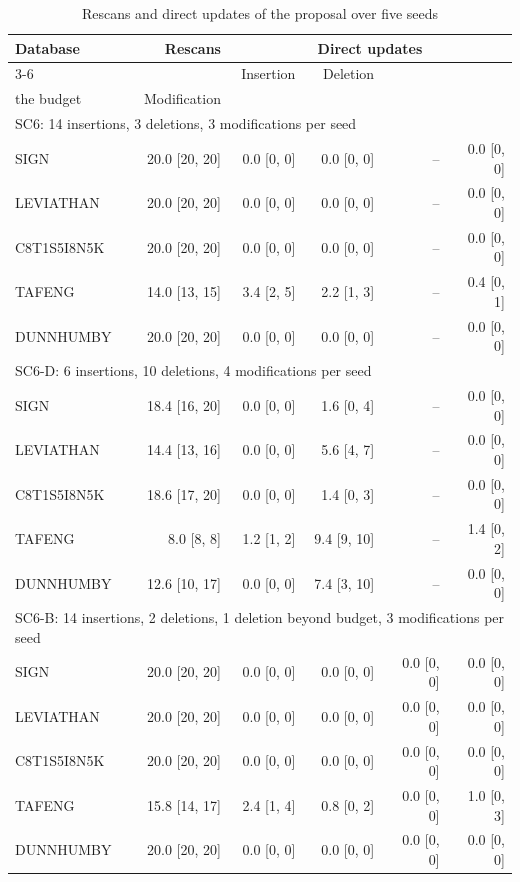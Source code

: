 \begin{table}[!htbp]\centering
\caption{Rescans and direct updates of the proposal over five seeds}\label{tab:sc6_branches}
\begin{tabular*}{\textwidth}{@{\extracolsep\fill}lrrrrr}\toprule
Database & Rescans & \multicolumn{4}{c}{Direct updates} \\\cmidrule{3-6}
 & & Insertion & Deletion & \begin{tabular}[b]{@{}r@{}}Deletion beyond\\the budget\end{tabular} & Modification \\
\midrule\multicolumn{6}{l}{SC6: 14 insertions, 3 deletions, 3 modifications per seed} \\
SIGN & 20.0 [20, 20] & 0.0 [0, 0] & 0.0 [0, 0] & -- & 0.0 [0, 0] \\
LEVIATHAN & 20.0 [20, 20] & 0.0 [0, 0] & 0.0 [0, 0] & -- & 0.0 [0, 0] \\
C8T1S5I8N5K & 20.0 [20, 20] & 0.0 [0, 0] & 0.0 [0, 0] & -- & 0.0 [0, 0] \\
TAFENG & 14.0 [13, 15] & 3.4 [2, 5] & 2.2 [1, 3] & -- & 0.4 [0, 1] \\
DUNNHUMBY & 20.0 [20, 20] & 0.0 [0, 0] & 0.0 [0, 0] & -- & 0.0 [0, 0] \\
\midrule\multicolumn{6}{l}{SC6-D: 6 insertions, 10 deletions, 4 modifications per seed} \\
SIGN & 18.4 [16, 20] & 0.0 [0, 0] & 1.6 [0, 4] & -- & 0.0 [0, 0] \\
LEVIATHAN & 14.4 [13, 16] & 0.0 [0, 0] & 5.6 [4, 7] & -- & 0.0 [0, 0] \\
C8T1S5I8N5K & 18.6 [17, 20] & 0.0 [0, 0] & 1.4 [0, 3] & -- & 0.0 [0, 0] \\
TAFENG & 8.0 [8, 8] & 1.2 [1, 2] & 9.4 [9, 10] & -- & 1.4 [0, 2] \\
DUNNHUMBY & 12.6 [10, 17] & 0.0 [0, 0] & 7.4 [3, 10] & -- & 0.0 [0, 0] \\
\midrule\multicolumn{6}{l}{SC6-B: 14 insertions, 2 deletions, 1 deletion beyond budget, 3 modifications per seed} \\
SIGN & 20.0 [20, 20] & 0.0 [0, 0] & 0.0 [0, 0] & 0.0 [0, 0] & 0.0 [0, 0] \\
LEVIATHAN & 20.0 [20, 20] & 0.0 [0, 0] & 0.0 [0, 0] & 0.0 [0, 0] & 0.0 [0, 0] \\
C8T1S5I8N5K & 20.0 [20, 20] & 0.0 [0, 0] & 0.0 [0, 0] & 0.0 [0, 0] & 0.0 [0, 0] \\
TAFENG & 15.8 [14, 17] & 2.4 [1, 4] & 0.8 [0, 2] & 0.0 [0, 0] & 1.0 [0, 3] \\
DUNNHUMBY & 20.0 [20, 20] & 0.0 [0, 0] & 0.0 [0, 0] & 0.0 [0, 0] & 0.0 [0, 0] \\
\bottomrule\end{tabular*}
\end{table}

